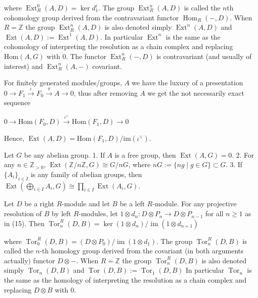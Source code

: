 where \( \operatorname{Ext}_R^0(A, D) = \ker d_1^i \). The group \( \operatorname{Ext}_R^n(A, D) \) is called the \( n \)\-th 
cohomology group derived from the contravariant functor \( \operatorname{Hom}_R(-, D) \). 
When \(R = \mathbb{Z}\) the group \( \operatorname{Ext}_R^n(A, D) \) 
is also denoted simply \(\operatorname{Ext}^n(A, D)\) and \(\operatorname{Ext}(A, D) := \operatorname{Ext}^1(A, D)\).
In particular \( \operatorname{Ext}^n \) is the same as the cohomology of interpreting the resolution as a chain complex and replacing 
\( \text{Hom}(A, G) \) with \( 0 \). The functor \( \operatorname{Ext}_R^n(-, D) \) is contravariant (and usually of interest) and 
\( \operatorname{Ext}_R^n(A, -) \) covariant.

For finitely generated modules/groups, \( A \) we have the luxury of a presentation \( 0 \longrightarrow F_1 \xrightarrow{\iota} F_0 \xrightarrow{\pi} A \longrightarrow 0 \),
thus after removing \( A \) we get the not necessarily exact sequence

\( 0 \longrightarrow \text{Hom}(F_0, D) \xrightarrow{\iota^\vee} \text{Hom}(F_1, D) \longrightarrow 0 \)

Hence, \( \operatorname{Ext}(A, D) = \text{Hom}(F_1, D) / \text{im}(\iota^\vee) \).

Let \(G\) be any abelian group.
1. If \(A\) is a free group, then \(\operatorname{Ext}(A, G) = 0\). 
2. For any \(n \in \mathbb{Z}_{>0}\), \(\operatorname{Ext}(\mathbb{Z}/n\mathbb{Z}, G) \cong G/nG\), where \(nG := \{ng \mid g \in G\} \subset G\).
3. If \(\{A_i\}_{i \in I}\) is any family of abelian groups, then \(\operatorname{Ext}\left( \bigoplus_{i \in I} A_i, G \right) \cong \prod_{i \in I} \operatorname{Ext}(A_i, G)\).


Let \(D\) be a right \(R\)-module and let \(B\) be a left \(R\)-module. For any projective resolution of \(B\) by left \(R\)-modules, let 
\(
1 \otimes d_n : D \otimes P_n \to D \otimes P_{n-1} 
\)
for all \(n \geq 1\) as in (15). Then
\(
\operatorname{Tor}_n^R(D, B) = \ker(1 \otimes d_n) / \operatorname{im}(1 \otimes d_{n+1})
\)

where \( \operatorname{Tor}_0^R(D, B) = (D \otimes P_0) / \operatorname{im}(1 \otimes d_1) \). 
The group \( \operatorname{Tor}_n^R(D, B) \) is called the \( n \)-th homology group derived from the covariant (in both arguments actually) functor \(D \otimes - \). 
When \(R = \mathbb{Z}\) the group \(\operatorname{Tor}_n^R(D, B)\) is also denoted simply \(\operatorname{Tor}_n(D, B)\) and
\(\operatorname{Tor}(D, B) := \operatorname{Tor}_1(D, B)\)
In particular \( \operatorname{Tor}_n \) is the same as the homology of interpreting the resolution as a chain complex and replacing 
\( D \otimes B \) with \( 0 \).


